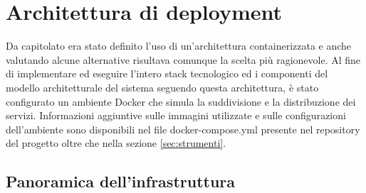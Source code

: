 \documentclass[10pt]{article}
\begin{document}


\newpage
\section{Architettura di deployment}
Da capitolato era stato definito l'uso di un'architettura containerizzata e anche valutando alcune alternative risultava comunque la scelta più ragionevole. Al fine di implementare ed eseguire l'intero stack tecnologico ed i componenti del modello architetturale del sistema seguendo questa architettura, è stato configurato un ambiente Docker che simula la suddivisione e la distribuzione dei servizi. Informazioni aggiuntive sulle immagini utilizzate e sulle configurazioni dell'ambiente sono disponibili nel file docker-compose.yml presente nel repository del progetto oltre che nella sezione \ref{sec:strumenti}.
    \subsection{Panoramica dell'infrastruttura}
\end{document}
